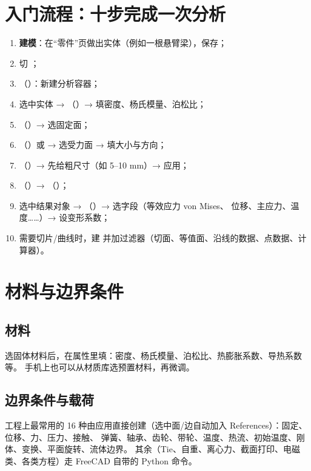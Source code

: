 \section{入门流程：十步完成一次分析}

\begin{enumerate}
  \item \textbf{建模}：在“零件”页做出实体（例如一根悬臂梁），保存；
  \item 切 ；
  \item {}（）：新建分析容器；
  \item 选中实体 → （）→ 填密度、杨氏模量、泊松比；
  \item {}（）→ 选固定面；
  \item {}（）或  → 选受力面 → 填大小与方向；
  \item {}（）→ 先给粗尺寸（如 5--10 mm）→ 应用；
  \item {}（）→ （）；
  \item 选中结果对象 → （）→ 选字段（等效应力 von Mises、
        位移、主应力、温度……）→ 设变形系数；
  \item 需要切片/曲线时，建  并加过滤器（切面、等值面、沿线的数据、点数据、计算器）。
\end{enumerate}

\section{材料与边界条件}

\subsection{材料}

 选固体材料后，在属性里填：密度、杨氏模量、泊松比、热膨胀系数、导热系数等。
手机上也可以从材质库选预置材料，再微调。

\subsection{边界条件与载荷}

工程上最常用的 16 种由应用直接创建（选中面/边自动加入 References）：固定、位移、力、压力、接触、
弹簧、轴承、齿轮、带轮、温度、热流、初始温度、刚体、变换、平面旋转、流体边界。
其余（Tie、自重、离心力、截面打印、电磁类、各类方程）走 FreeCAD 自带的 Python 命令。

